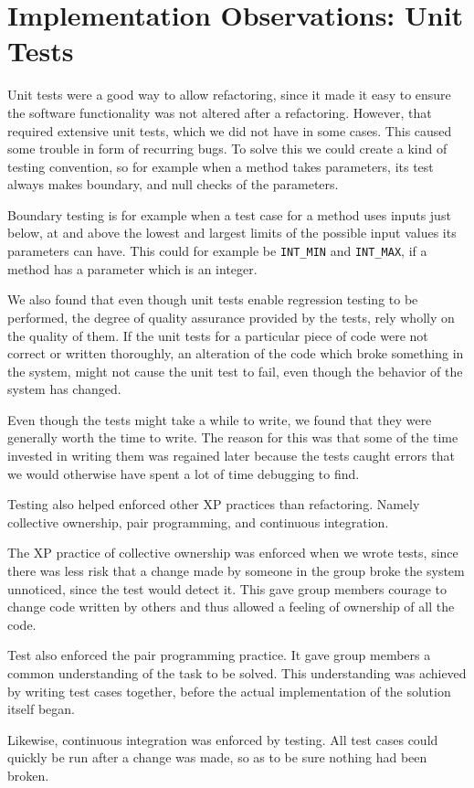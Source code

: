 \section{Implementation Observations: Unit Tests}
\label{sec:testImplObservations}
Unit tests were a good way to allow refactoring, since it made it easy to ensure the software functionality was not altered after a refactoring. However, that required extensive unit tests, which we did not have in some cases. This caused some trouble in form of recurring bugs. To solve this we could create a kind of testing convention, so for example when a method takes parameters, its test always makes boundary, and null checks of the parameters.%

Boundary testing is for example when a test case for a method uses inputs just below, at and above the lowest and largest limits of the possible input values its parameters can have. This could for example be \texttt{INT\_MIN} and \texttt{INT\_MAX}, if a method has a parameter which is an integer.

We also found that even though unit tests enable regression testing to be performed, the degree of quality assurance provided by the tests, rely wholly on the quality of them. If the unit tests for a particular piece of code were not correct or written thoroughly, an alteration of the code which broke something in the system, might not cause the unit test to fail, even though the behavior of the system has changed.

Even though the tests might take a while to write, we found that they were generally worth the time to write. The reason for this was that some of the time invested in writing them was regained later because the tests caught errors that we would otherwise have spent a lot of time debugging to find.


Testing also helped enforced other XP practices than refactoring. Namely collective ownership, pair programming, and continuous integration. 

The XP practice of collective ownership was enforced when we wrote tests, since there was less risk that a change made by someone in the group broke the system unnoticed, since the test would detect it. This gave group members courage to change code written by others and thus allowed a feeling of ownership of all the code. 

Test also enforced the pair programming practice. It gave group members a common understanding of the task to be solved. This understanding was achieved by writing test cases together, before the actual implementation of the solution itself began.

Likewise, continuous integration was enforced by testing. All test cases could quickly be run after a change was made, so as to be sure nothing had been broken.

